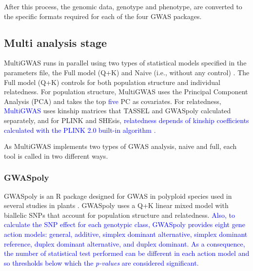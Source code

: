 \documentclass{article}
\begin{document}
After this process, the genomic data, genotype and phenotype, are converted to the specific formats required for each of the four GWAS packages.

\subsection{Multi analysis stage}
MultiGWAS runs in parallel using two types of statistical models specified in the parameters file, the Full model (Q+K) and Naive (i.e., without any control) \cite{Sharma2018}. The Full model (Q+K) controls for both population structure and individual relatedness. For population structure, MultiGWAS uses the Principal Component Analysis (PCA) and takes the top \textcolor{blue}{five} PC as covariates. For relatedness, \textcolor{blue}{MultiGWAS} uses kinship matrices that TASSEL and GWASpoly calculated separately, and for PLINK and SHEsis, \textcolor{blue}{relatedness depends of kinship coefficients calculated with the PLINK 2.0 built-in algorithm \cite{Chang2015}. }


As MultiGWAS implements two types of GWAS analysis, naive and full, each tool is called in two different ways. %

\subsubsection{GWASpoly}

GWASpoly \cite{Rosyara2016} is an R package designed for GWAS in polyploid species used in several studies in plants \cite{Berdugo2017,Ferrao2018,Sharma2018,Yuan2019}. GWASpoly uses a Q+K linear mixed model with biallelic SNPs that account for population structure and relatedness. \textcolor{blue}{Also, to calculate the SNP effect for each genotypic class, GWASpoly provides eight gene action models: general, additive, simplex dominant alternative, simplex dominant reference, duplex dominant alternative, and duplex dominant. As a consequence, the number of statistical test performed can be different in each action model and so thresholds below which the }\textcolor{blue}{\emph{p-values}}\textcolor{blue}{{} are considered significant.}
\end{document}
